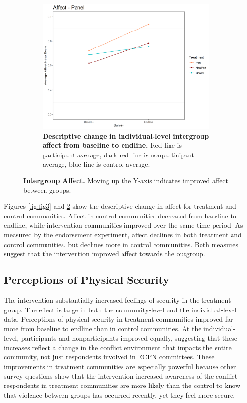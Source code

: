 \documentclass[11pt]{article}
\begin{document}
\begin{figure}[H]
\begin{subfigure}[b]{.48\textwidth}
        \includegraphics[width=\linewidth]{../../../figs/affectPan_plot.png}
        \caption{\textbf{Descriptive change in individual-level intergroup affect from baseline to endline.} Red line is participant average, dark red line is nonparticipant average, blue line is control average.}
        \label{fig:fig4}
    \end{subfigure}
\caption{\textbf{Intergroup Affect.} Moving up the Y-axis indicates improved affect between groups.}
\end{figure}

Figures \ref{fig:fig3} and \ref{fig:fig4} show the descriptive change in
affect for treatment and control communities. Affect in control
communities decreased from baseline to endline, while intervention
communities improved over the same time period. As measured by the
endorsement experiment, affect declines in both treatment and control
communities, but declines more in control communities. Both measures
suggest that the intervention improved affect towards the outgroup.

\hypertarget{perceptions-of-physical-security}{%
\subsection{Perceptions of Physical
Security}\label{perceptions-of-physical-security}}

The intervention substantially increased feelings of security in the
treatment group. The effect is large in both the community-level and the
individual-level data. Perceptions of physical security in treatment
communities improved far more from baseline to endline than in control
communities. At the individual-level, participants and nonparticipants
improved equally, suggesting that these increases reflect a change in
the conflict environment that impacts the entire community, not just
respondents involved in ECPN committees. These improvements in treatment
communities are especially powerful because other survey questions show
that the intervention increased awareness of the conflict -- respondents
in treatment communities are more likely than the control to know that
violence between groups has occurred recently, yet they feel more
secure.
\end{document}
